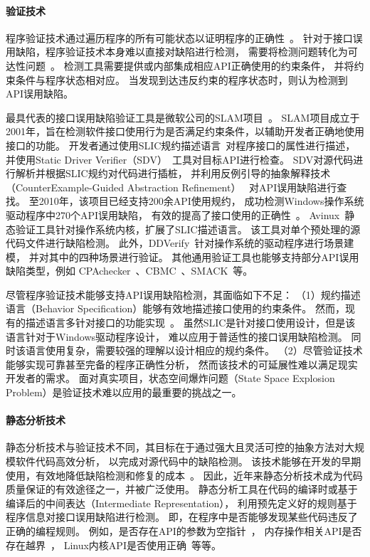 \paragraph{验证技术}
程序验证技术通过遍历程序的所有可能状态以证明程序的正确性~\cite{08-tcad-sv}。
针对于接口误用缺陷，程序验证技术本身难以直接对缺陷进行检测，
需要将检测问题转化为可达性问题~\cite{rp}。
检测工具需要提供或内部集成相应API正确使用的约束条件，
并将约束条件与程序状态相对应。
当发现到达违反约束的程序状态时，则认为检测到API误用缺陷。

最具代表的接口误用缺陷验证工具是微软公司的SLAM项目~\cite{slam}。
SLAM项目成立于2001年，旨在检测软件接口使用行为是否满足约束条件，以辅助开发者正确地使用接口的功能。
开发者通过使用SLIC规约描述语言~\cite{01-slic}对程序接口的属性进行描述，
并使用Static Driver Verifier（SDV）~\cite{02-acm-slam}工具对目标API进行检查。
SDV对源代码进行解析并根据SLIC规约对代码进行插桩，
并利用反例引导的抽象解释技术（CounterExample-Guided Abstraction Refinement）
~\cite{00-cav-counter,02-acm-abs}对API误用缺陷进行查找。
至2010年，该项目已经支持200余API使用规约，
成功检测Windows操作系统驱动程序中270个API误用缺陷，
有效的提高了接口使用的正确性~\cite{10-cad-slam, 11-acm-slam}。
Avinux~\cite{09-avinux}静态验证工具针对操作系统内核，扩展了SLIC描述语言。
该工具对单个预处理的源代码文件进行缺陷检测。
此外，DDVerify~\cite{07-ase-ddverify}针对操作系统的驱动程序进行场景建模，
并对其中的四种场景进行验证。
其他通用验证工具也能够支持部分API误用缺陷类型，例如
CPAchecker~\cite{07-cav-cpachecker}、CBMC~\cite{14-tacas-cbmc}、SMACK~\cite{14-cav-smack}等。


尽管程序验证技术能够支持API误用缺陷检测，其面临如下不足：
（1）规约描述语言（Behavior Specification）能够有效地描述接口使用的约束条件。
然而，现有的描述语言多针对接口的功能实现~\cite{blast, acsl}。
虽然SLIC是针对接口使用设计，但是该语言针对于Windows驱动程序设计，
难以应用于普适性的接口误用缺陷检测。
同时该语言使用复杂，需要较强的理解以设计相应的规约条件。
（2）尽管验证技术能够实现可靠甚至完备的程序正确性分析，
然而该技术的可延展性难以满足现实开发者的需求。
面对真实项目，状态空间爆炸问题（State Space Explosion Problem）是验证技术难以应用的最重要的挑战之一。

\paragraph{静态分析技术}
静态分析技术与验证技术不同，其目标在于通过强大且灵活可控的抽象方法对大规模软件代码高效分析，
以完成对源代码中的缺陷检测。
该技术能够在开发的早期使用，有效地降低缺陷检测和修复的成本~\cite{06-cost}。
因此，近年来静态分析技术成为代码质量保证的有效途径之一，并被广泛使用。
静态分析工具在代码的编译时或基于编译后的中间表达（Intermediate Representation），
利用预先定义好的规则基于程序信息对接口误用缺陷进行检测。
即，在程序中是否能够发现某些代码违反了正确的编程规则。
例如，是否存在API的参数为空指针~\cite{00-osdi-npd}，
内存操作相关API是否存在越界~\cite{11-ras-overflow}，
Linux内核API是否使用正确~\cite{09-dsn-linux}等等。

